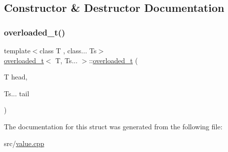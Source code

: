 \subsection{Constructor \& Destructor Documentation}
\mbox{\label{structoverloaded__t_3_01_t_00_01_ts_8_8_8_01_4_a72b691d04beb46c5843195c37aa41bf8}} 
\subsubsection{\texorpdfstring{overloaded\+\_\+t()}{overloaded\_t()}}
{\footnotesize\ttfamily template$<$class T , class... Ts$>$ \\
\hyperlink{structoverloaded__t}{overloaded\+\_\+t}$<$ T, Ts... $>$\+::\hyperlink{structoverloaded__t}{overloaded\+\_\+t} (\begin{DoxyParamCaption}\item[{T}]{head,  }\item[{Ts...}]{tail }\end{DoxyParamCaption})\hspace{0.3cm}{\ttfamily [inline]}}



The documentation for this struct was generated from the following file\+:\begin{DoxyCompactItemize}
\item 
src/\hyperlink{value_8cpp}{value.\+cpp}\end{DoxyCompactItemize}

